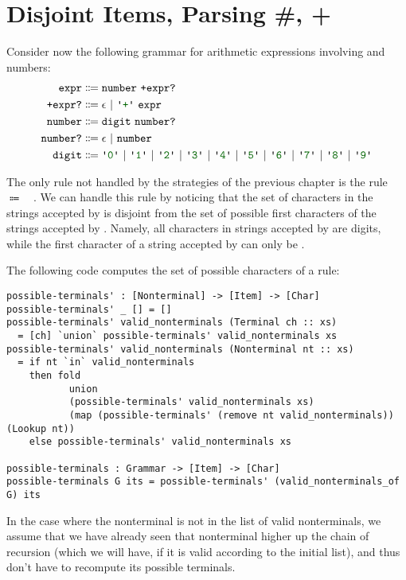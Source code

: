 \chapter{Disjoint Items, Parsing \#, +} \label{ch:disjoint}

  Consider now the following grammar for arithmetic expressions involving \terminal{+} and numbers:
  \begin{align*}
    \nt{expr} & \Coloneqq \nt{number}~\nt{+expr?} \\
    \nt{+expr?} & \Coloneqq \nt{$\epsilon$}~|~\terminal{+}~\nt{expr} \\
    \nt{number} & \Coloneqq \nt{digit}~\nt{number?} \\
    \nt{number?} & \Coloneqq \epsilon~|~\nt{number} \\
    \nt{digit} & \Coloneqq \terminal{0}~|~\terminal{1}~|~\terminal{2}~|~\terminal{3}~|~\terminal{4}~|~\terminal{5}~|~\terminal{6}~|~\terminal{7}~|~\terminal{8}~|~\terminal{9}
  \end{align*}
  
  The only rule not handled by the strategies of the previous chapter is the rule ~$\Coloneqq$~~.  We can handle this rule by noticing that the set of characters in the strings accepted by  is disjoint from the set of possible first characters of the strings accepted by .  Namely, all characters in strings accepted by  are digits, while the first character of a string accepted by  can only be \terminal{+}.
  
  The following code computes the set of possible characters of a rule:
\begin{verbatim}
possible-terminals' : [Nonterminal] -> [Item] -> [Char]
possible-terminals' _ [] = []
possible-terminals' valid_nonterminals (Terminal ch :: xs)
  = [ch] `union` possible-terminals' valid_nonterminals xs
possible-terminals' valid_nonterminals (Nonterminal nt :: xs)
  = if nt `in` valid_nonterminals
    then fold
           union
           (possible-terminals' valid_nonterminals xs)
           (map (possible-terminals' (remove nt valid_nonterminals)) (Lookup nt))
    else possible-terminals' valid_nonterminals xs

possible-terminals : Grammar -> [Item] -> [Char]
possible-terminals G its = possible-terminals' (valid_nonterminals_of G) its
\end{verbatim}
    In the case where the nonterminal is not in the list of valid nonterminals, we assume that we have already seen that nonterminal higher up the chain of recursion (which we will have, if it is valid according to the initial list), and thus don't have to recompute its possible terminals.

